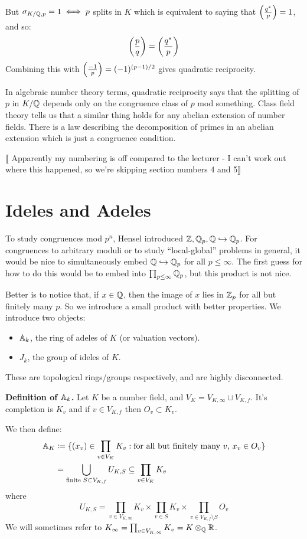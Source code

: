 \documentclass[10pt,a4paper]{article}
\begin{document}
But $\sigma_{K/\mathbb{Q}, p} = 1 \iff p$ splits in $K$ which is equivalent to saying that $\left(\frac{q^\ast}{p}\right) = 1$, and so:
\[\left(\frac{p}{q}\right) = \left(\frac{q^\ast}{p}\right)\]
Combining this with $\left(\frac{-1}{p}\right) = (-1)^{(p-1)/2}$ gives quadratic reciprocity.

In algebraic number theory terms, quadratic reciprocity says that the splitting of $p$ in $K/\mathbb{Q}$ depends only on the congruence class of $p$ mod something. Class field theory tells us that a similar thing holds for any abelian extension of number fields. There is a law describing the decomposition of primes in an abelian extension which is just a congruence condition.

$\llbracket$ Apparently my numbering is off compared to the lecturer - I can't work out where this happened, so we're skipping section numbers 4 and 5$\rrbracket$
\addtocounter{section}{2}
\section{Ideles and Adeles}
To study congruences mod $p^n$, Hensel introduced $\mathbb{Z}, \mathbb{Q}_p, \mathbb{Q} \hookrightarrow \mathbb{Q}_p$. For congruences to arbitrary moduli or to study ``local-global'' problems in general, it would be nice to simultaneously embed $\mathbb{Q} \hookrightarrow \mathbb{Q}_p$ for all $p \leq \infty$. The first guess for how to do this would be to embed into $\prod_{p \leq \infty}\mathbb{Q}_p$, but this product is not nice.

Better is to notice that, if $x \in \mathbb{Q}$, then the image of $x$ lies in $\mathbb{Z}_p$ for all but finitely many $p$. So we introduce a small product with better properties. We introduce two objects:
\begin{itemize}
  \item $\mathbb{A}_k$, the ring of adeles of $K$ (or valuation vectors).
  \item $J_k$, the group of ideles of $K$.
\end{itemize}
These are topological rings/groups respectively, and are highly disconnected.

\textbf{Definition of $\mathbb{A}_k$.} Let $K$ be a number field, and $V_K = V_{K,\infty} \sqcup V_{K,f}$. It's completion is $K_v$ and if $v \in V_{K,f}$ then $O_v \subset K_v$.

We then define:
\begin{align*}
  \mathbb{A}_K &\coloneqq \{(x_v) \in \prod_{v \in V_K}K_v : \text{for all but finitely many $v$, $x_v \in O_v$}\}\\
  &= \bigcup_{\text{finite } S \subset V_{K,f}}U_{K,S} \subseteq \prod_{v \in V_K}K_v
\end{align*}
where
\[U_{K,S} = \prod_{v \in V_{K,\infty}}K_v \times \prod_{v \in S} K_v \times \prod_{v \in V_{K,f}\setminus S}O_v\]
We will sometimes refer to $K_{\infty}  =\prod_{v \in V_{K,\infty}}K_v = K\otimes_{\mathbb{Q}} \mathbb{R}$.
\end{document}
